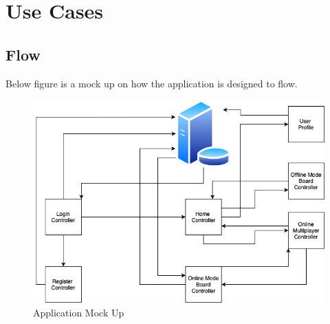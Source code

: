 \documentclass{article}
\begin{document}
\section{Use Cases}
    \subsection{Flow}
        Below figure is a mock up on how the application is designed to flow.\\ 
        \begin{figure}[h]
        \centering
        \includegraphics[width=5in]{images/tictacreflexdiagram.png}
        \caption{Application Mock Up}
        \end{figure}
        ~\newline
        ~\newpage
\end{document}
